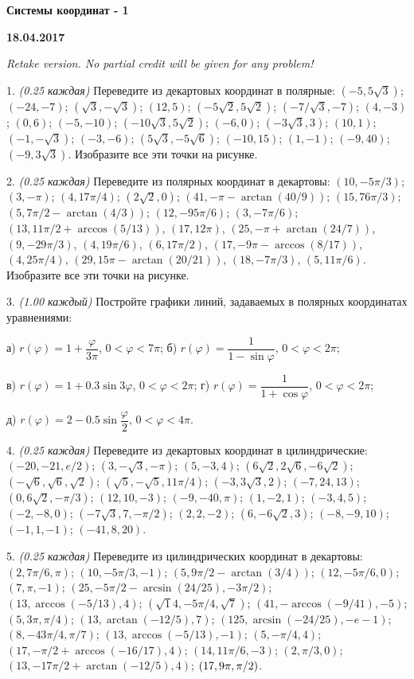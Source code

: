 \documentclass[14pt]{article}
\begin{document}
\begin{center}
\Large{\textbf{Системы координат - 1}}

\textbf{18.04.2017}

\vspace{5mm}
\end{center}

\textit{Retake version. No partial credit will be given for any problem!}

1. \textit{(0.25 каждая)} Переведите из декартовых координат в полярные: $(-5,5\sqrt3)$; $(-24,-7)$; $(\sqrt3,-\sqrt3)$; $(12,5)$; $(-5\sqrt2,5\sqrt2)$; $(-7/\sqrt3,-7)$; $(4,-3)$; $(0,6)$; $(-5,-10)$; $(-10\sqrt3,5\sqrt2)$; $(-6,0)$; $(-3\sqrt3,3)$; $(10,1)$; $(-1,-\sqrt3)$; $(-3,-6)$; $(5\sqrt3,-5\sqrt6)$; $(-10,15)$; $(1,-1)$; $(-9,40)$; $(-9,3\sqrt3)$. Изобразите все эти точки на рисунке.

2. \textit{(0.25 каждая)} Переведите из полярных координат в декартовы: $(10,-5\pi/3)$; $(3,-\pi)$; $(4,17\pi/4)$; $(2\sqrt2,0)$; $(41,-\pi-\arctan(40/9))$; $(15,76\pi/3)$; $(5,7\pi/2-\arctan(4/3))$; $(12,-95\pi/6)$; $(3,-7\pi/6)$; $(13,11\pi/2+\arccos(5/13))$, $(17,12\pi)$, $(25,-\pi+\arctan(24/7))$, $(9,-29\pi/3)$, $(4,19\pi/6)$, $(6,17\pi/2)$, $(17,-9\pi-\arccos(8/17))$, $(4,25\pi/4)$, $(29,15\pi-\arctan(20/21))$, $(18,-7\pi/3)$, $(5,11\pi/6)$. Изобразите все эти точки на рисунке.

3. \textit{(1.00 каждый)} Постройте графики линий, задаваемых в полярных координатах уравнениями:

а) $r(\varphi)=1+\dfrac{\varphi}{3\pi}$, $0<\varphi<7\pi$;
\hspace{3.5cm}
б) $r(\varphi)=\dfrac{1}{1-\sin\varphi}$, $0<\varphi<2\pi$;

в) $r(\varphi)=1+0.3\sin 3\varphi$, $0<\varphi<2\pi$;
\hspace{2.55cm}
г) $r(\varphi)=\dfrac{1}{1+\cos\varphi}$, $0<\varphi<2\pi$;

д) $r(\varphi)=2-0.5\sin \dfrac{\varphi}{2}$, $0<\varphi<4\pi$.

4. \textit{(0.25 каждая)} Переведите из декартовых координат в цилиндрические: $(-20,-21,e/2)$; $(3,-\sqrt3,-\pi)$; $(5,-3,4)$; $(6\sqrt2, 2\sqrt6,-6\sqrt2)$; $(-\sqrt6,\sqrt6,\sqrt2)$; $(\sqrt5,-\sqrt5,11\pi/4)$; $(-3,3\sqrt3,2)$; $(-7,24,13)$; $(0,6\sqrt2,-\pi/3)$; $(12, 10, -3)$; $(-9,-40,\pi)$; $(1,-2,1)$; $(-3,4,5)$; $(-2,-8,0)$; $(-7\sqrt3,7,-\pi/2)$; $(2,2,-2)$; $(6,-6\sqrt2,3)$; $(-8,-9,10)$; $(-1,1,-1)$; $(-41,8,20)$.

5. \textit{(0.25 каждая)} Переведите из цилиндрических координат в декартовы: $(2,7\pi/6,\pi)$; $(10,-5\pi/3,-1)$; $(5,9\pi/2-\arctan(3/4))$; $(12,-5\pi/6,0)$; $(7,\pi,-1)$; $(25,-5\pi/2-\arcsin(24/25),-3\pi/2)$; $(13,\arccos(-5/13),4)$; $(\sqrt14,-5\pi/4,\sqrt7)$; $(41,-\arccos(-9/41),-5)$; $(5,3\pi,\pi/4)$; $(13,\arctan(-12/5),7)$; $(125,\arcsin(-24/25),-e-1)$; $(8,-43\pi/4,\pi/7)$; $(13,\arccos(-5/13),-1)$; $(5,-\pi/4,4)$; $(17,-\pi/2+\arccos(-16/17),4)$; $(14,11\pi/6,-3)$; $(2,\pi/3,0)$; $(13,-17\pi/2+\arctan(-12/5),4)$; $(17,\-9\pi,\pi/2)$.
\end{document}
